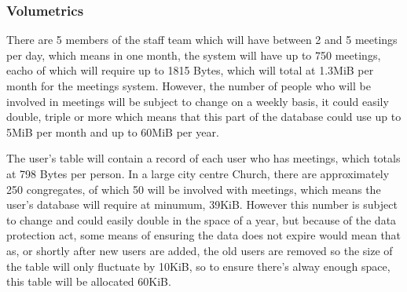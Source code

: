 \subsubsection{Volumetrics}

	There are 5 members of the staff team which will have between 2 and 5 meetings per day, which means in one month, the system will have up to 750 meetings, eacho of which will require up to 1815 Bytes, which will total at 1.3MiB per month for the meetings system. However, the number of people who will be involved in meetings will be subject to change on a weekly basis, it could easily double, triple or more which means that this part of the database could use up to 5MiB per month and up to 60MiB per year.

	The user's table will contain a record of each user who has meetings, which totals at 798 Bytes per person. In a large city centre Church, there are approximately 250 congregates, of which 50 will be involved with meetings, which means the user's database will require at minumum, 39KiB. However this number is subject to change and could easily double in the space of a year, but because of the data protection act, some means of ensuring the data does not expire would mean that as, or shortly after new users are added, the old users are removed so the size of the table will only fluctuate by \pm10KiB, so to ensure there's alway enough space, this table will be allocated 60KiB.

